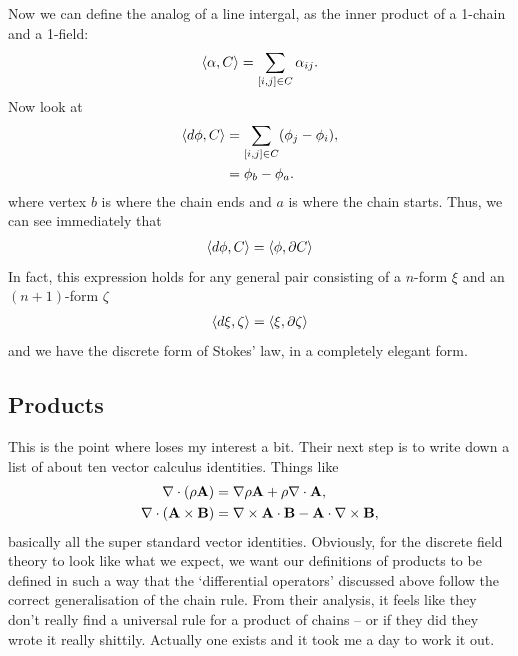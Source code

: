 \documentclass[11pt, oneside]{article} %
\numberwithin{equation}{section}
\begin{document}
Now we can define the analog of a line intergal, as the inner product of a 1-chain and a 1-field:
\begin{align}
    \left \langle \alpha, C \right \rangle = \sum_{[i,j]\in C} \alpha_{ij}.
\end{align}
Now look at 
\begin{align}
    \left \langle d\phi, C \right \rangle &= \sum_{[i,j]\in C}(\phi_j - \phi_i),\\
    & = \phi_b - \phi_a.
\end{align}
where vertex $b$ is where the chain ends and $a$ is where the chain starts. Thus, we can see immediately that
\begin{align}
    \left \langle d \phi, C \right \rangle = \left \langle \phi, \partial C \right \rangle
\end{align}
In fact, this expression holds for any general pair consisting of a $n$-form $\xi$ and an $(n+1)$-form $\zeta$
\begin{align}
    \left \langle d\xi, \zeta \right \rangle = \left \langle \xi, \partial \zeta \right \rangle
\end{align}
and we have the discrete form of Stokes' law, in a completely elegant form.

\subsection{Products}

This is the point where \cite{schwalm_vector_1999} loses my interest a bit. Their next step is to write down a list of about ten vector calculus identities. Things like 
\begin{align}
    \nabla \cdot (\rho \textbf A)
    & = \nabla \rho \textbf A + \rho \nabla\cdot \textbf A,\\
    \nabla \cdot (\textbf A \times  \textbf B)
    & = 
    \nabla \times \textbf A\cdot  \textbf B - 
     \textbf A\cdot  \nabla \times\textbf B ,
\end{align}
basically all the super standard vector identities. Obviously, for the discrete field theory to look like what we expect, we want our definitions of products to be defined in such a way that the `differential operators' discussed above follow the correct generalisation of the chain rule. From their analysis, it feels like they don't really find a universal rule for a product of chains -- or if they did they wrote it really shittily. Actually one exists and it took me a day to work it out.
\end{document}
